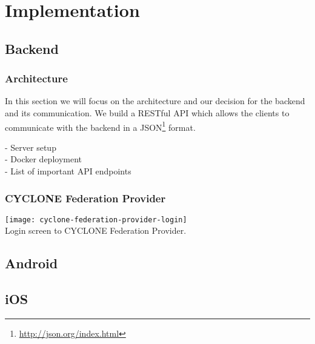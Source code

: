 \chapter{Implementation}
\label{cha:implementation}


\section{Backend}

\subsection{Architecture}

In this section we will focus on the architecture and our decision for the backend and its communication. We build a RESTful API which allows the clients to communicate with the backend in a JSON\footnote{\url{http://json.org/index.html}} format.


- Server setup\\
- Docker deployment\\
- List of important API endpoints


\subsection{CYCLONE Federation Provider}

\begin{center}
    \texttt{[image: cyclone-federation-provider-login]}\\
    Login screen to CYCLONE Federation Provider.
\end{center}


\vspace{0.5cm}

\section{Android}


\vspace{0.5cm}

\section{iOS}
